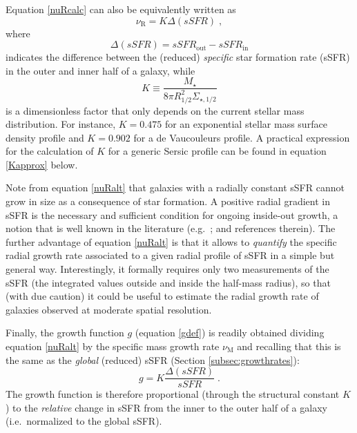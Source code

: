 \documentclass[fleqn,usenatbib]{mnras}
\begin{document}
Equation \eqref{nuRcalc} can also be equivalently written as
\begin{equation}\label{nuRalt}
\nu_\textrm{R} = K \Delta (sSFR) \; ,
\end{equation}
where
\begin{equation}
\Delta (sSFR) =  sSFR_\textrm{out}-sSFR_\textrm{in}
\end{equation}
indicates the difference between the (reduced) \emph{specific} star formation rate (sSFR) in the outer and inner half of a galaxy, while
\begin{equation}\label{Kdef}
K \equiv \frac{M_\star}{8 \pi R_{1/2}^2 \Sigma_{\star,1/2}}
\end{equation}
is a dimensionless factor that only depends on the current stellar mass distribution. For instance, $K = 0.475$ for an exponential stellar mass surface density profile and $K = 0.902$ for a de Vaucouleurs profile. A practical expression for the calculation of $K$ for a generic Sersic profile can be found in equation \eqref{Kapprox} below.

Note from equation \eqref{nuRalt} that galaxies with a radially constant sSFR cannot grow in size as a consequence of star formation. A positive radial gradient in sSFR is the necessary and sufficient condition for ongoing inside-out growth, a notion that is well known in the literature (e.g.\ \citealt{MM07}; \citealt{Wang+19} and references therein). The further advantage of equation \eqref{nuRalt} is that it allows to \emph{quantify} the specific radial growth rate associated to a given radial profile of sSFR in a simple but general way. Interestingly, it formally requires only two measurements of the sSFR (the integrated values outside and inside the half-mass radius), so that (with due caution) it could be useful to estimate the radial growth rate of galaxies observed at moderate spatial resolution.

Finally, the growth function $g$ (equation \ref{gdef}) is readily obtained dividing equation \eqref{nuRalt} by the specific mass growth rate $\nu_\textrm{M}$ and recalling that this is the same as the \emph{global} (reduced) sSFR (Section \ref{subsec:growthrates}):
\begin{equation}\label{g_sSFR}
g = K \frac{\Delta (sSFR)}{sSFR} \;.
\end{equation}
The growth function is therefore proportional (through the structural constant $K$) to the \emph{relative} change in sSFR from the inner to the outer half of a galaxy (i.e.\ normalized to the global sSFR).
\end{document}
